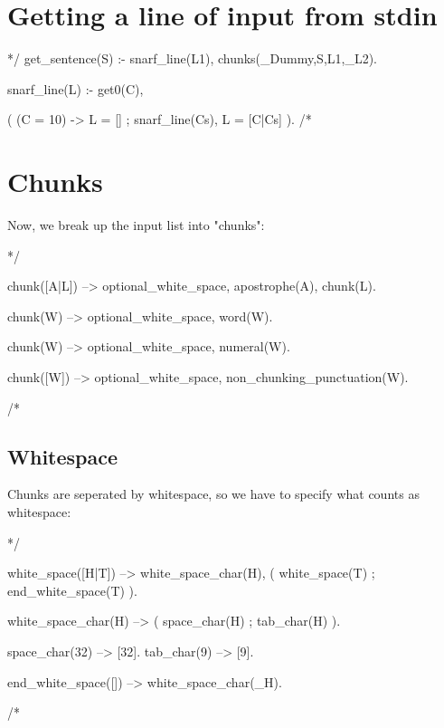 \documentclass{book}[9pt]
\newenvironment{code}%
{\small \verbatim}%
{\endverbatim \large}
\begin{document}
\section{Getting a line of input from stdin}

\begin{code}
*/
get_sentence(S) :-
        snarf_line(L1),
        chunks(_Dummy,S,L1,_L2).

snarf_line(L) :-
        get0(C),
        
        ( (C = 10) ->
            L = []
        ;
            snarf_line(Cs),
            L = [C|Cs]
        ).
/*
\end{code}

\section{Chunks}

Now, we break up the input list into "chunks":

\begin{code}
*/

chunk([A|L]) -->
        optional_white_space,
        apostrophe(A),
        chunk(L).

chunk(W) -->
        optional_white_space,
        word(W).

chunk(W) -->
        optional_white_space,
        numeral(W).

chunk([W]) -->
        optional_white_space,
        non_chunking_punctuation(W).

/*
\end{code}

\subsection{Whitespace}

Chunks are seperated by whitespace, so we have to specify what counts as
whitespace:

\begin{code}
*/

white_space([H|T]) -->
        white_space_char(H),
        (
          white_space(T)
        ;
          end_white_space(T)
        ).

white_space_char(H) -->
        (
          space_char(H)
        ;
          tab_char(H)
        ).

space_char(32) --> [32].
tab_char(9)    --> [9].

end_white_space([]) --> \+ white_space_char(_H).

/*
\end{code}
\end{document}
